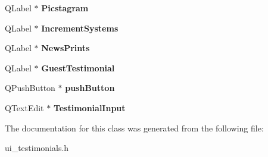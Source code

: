 \begin{DoxyCompactItemize}
Q\+Label $\ast$ {\bfseries Picstagram}
\item 
\mbox{\label{class_ui___testimonials_aa6ebbaa0de42607555751f586c8c8958}} 
Q\+Label $\ast$ {\bfseries Increment\+Systems}
\item 
\mbox{\label{class_ui___testimonials_a80d6ac00817cc66f1f9cc72d86e507d1}} 
Q\+Label $\ast$ {\bfseries News\+Prints}
\item 
\mbox{\label{class_ui___testimonials_ae050c5064f71fc3cc8721cd2f49c93b9}} 
Q\+Label $\ast$ {\bfseries Guest\+Testimonial}
\item 
\mbox{\label{class_ui___testimonials_ab91a41865930bc68a3c05c2d2eaf6c07}} 
Q\+Push\+Button $\ast$ {\bfseries push\+Button}
\item 
\mbox{\label{class_ui___testimonials_acb6414bff1f9596631e267f7e59c42fb}} 
Q\+Text\+Edit $\ast$ {\bfseries Testimonial\+Input}
\end{DoxyCompactItemize}


The documentation for this class was generated from the following file\+:\begin{DoxyCompactItemize}
\item 
ui\+\_\+testimonials.\+h\end{DoxyCompactItemize}
